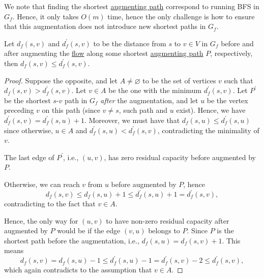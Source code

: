 We note that finding the shortest \hyperref[def:augmenting-path]{augmenting path} correspond to running BFS in \(G_f\). Hence, it only takes \(O(m)\) time, hence the only challenge is how to ensure that this augmentation does not introduce new shortest paths in \(G_f\).

\begin{lemma}\label{lma:shortest-augmenting-path-non-decreasing}
	Let \(d_f(s, v)\) and \(d_f^{\prime} (s, v)\) to be the distance from \(s\) to \(v \in V\) in \(G_f\) before and after augmenting the \hyperref[def:flow]{flow} along some shortest \hyperref[def:augmenting-path]{augmenting path} \(P\), respectively, then \(d_f(s, v) \leq d_f^{\prime} (s, v)\).
\end{lemma}
\begin{proof}
	Suppose the opposite, and let \(A \neq \varnothing \) to be the set of vertices \(v\) such that \(d_f(s, v) > d_f^{\prime} (s, v)\). Let \(v\in A\) be the one with the minimum \(d_f^{\prime} (s, v)\). Let \(P^{\prime} \) be the shortest \(s\)-\(v\) path in \(G_f\) \emph{after} the augmentation, and let \(u\) be the vertex preceding \(v\) on this path (since \(v \neq s\), such path and \(u\) exist). Hence, we have \(d_f^{\prime} (s, v) = d_f^{\prime} (s, u) + 1\). Moreover, we must have that \(d_f(s, u) \leq d_f^{\prime} (s, u)\) since otherwise, \(u \in A\) and \(d_f^{\prime} (s, u) < d_f^{\prime} (s, v)\), contradicting the minimality of \(v\).

	\begin{claim}
		The last edge of \(P^{\prime} \), i.e., \((u, v)\), has zero residual capacity before augmented by \(P\).
	\end{claim}
	\begin{explanation}
		Otherwise, we can reach \(v\) from \(u\) before augmented by \(P\), hence
		\[
			d_f(s, v)
			\leq d_f(s, u) + 1
			\leq d_f^{\prime} (s, u) + 1
			= d_f^{\prime} (s, v),
		\]
		contradicting to the fact that \(v \in A\).
	\end{explanation}

	Hence, the only way for \((u, v)\) to have non-zero residual capacity after augmented by \(P\) would be if the edge \((v, u)\) belongs to \(P\). Since \(P\) is the shortest path before the augmentation, i.e., \(d_f(s, u) = d_f(s, v) + 1\). This means
	\[
		d_f(s, v)
		= d_f(s, u) - 1
		\leq d_f^{\prime} (s, u) - 1
		= d_f^{\prime} (s, v) - 2
		\leq d_f^{\prime} (s, v),
	\]
	which again contradicts to the assumption that \(v \in A\).
\end{proof}

